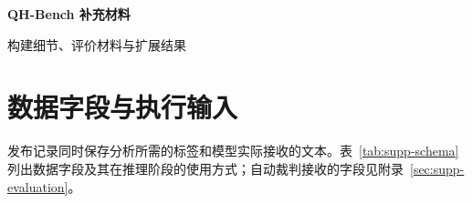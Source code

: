 \renewcommand{\thefigure}{S\arabic{figure}}
\renewcommand{\thetable}{S\arabic{table}}
\renewcommand{\theHfigure}{S\arabic{figure}}
\renewcommand{\theHtable}{S\arabic{table}}
\setcounter{figure}{0}
\setcounter{table}{0}
\suppressfloats[t]


\newcommand{\SuppExampleHeader}[2]{%
  \begingroup\setlength{\fboxsep}{5pt}%
  \noindent\colorbox{supppurple}{%
    \parbox{\dimexpr\textwidth-2\fboxsep\relax}{%
      \textcolor{white}{\bfseries #1}\hfill\textcolor{white}{\small #2}}}%
  \endgroup}
\newcommand{\SuppCallout}[1]{%
  \begingroup\setlength{\fboxsep}{5pt}%
  \noindent\colorbox{supporangepale}{%
    \parbox{\dimexpr\textwidth-2\fboxsep\relax}{\small #1}}%
  \endgroup}
\newcommand{\SuppSingleCard}[4]{%
  \begingroup\setlength{\fboxsep}{5pt}%
  \noindent\colorbox{supppale}{%
    \parbox{\dimexpr\linewidth-2\fboxsep\relax}{%
      \small\textcolor{suppblue}{\bfseries #1}\par\smallskip
      \textbf{背景。} #2\par\smallskip
      \textbf{用户消息。} #3\par\smallskip
      \textbf{风险说明。} #4}}%
  \endgroup}

\begin{center}
{\LARGE\bfseries QH-Bench 补充材料\par}
\vspace{4pt}
{\large 构建细节、评价材料与扩展结果\par}
\end{center}
\vspace{6pt}

\section{数据字段与执行输入}\hypertarget{supp-construction}{}

发布记录同时保存分析所需的标签和模型实际接收的文本。表~\ref{tab:supp-schema} 列出数据字段及其在推理阶段的使用方式；自动裁判接收的字段见附录~\ref{sec:supp-evaluation}。

